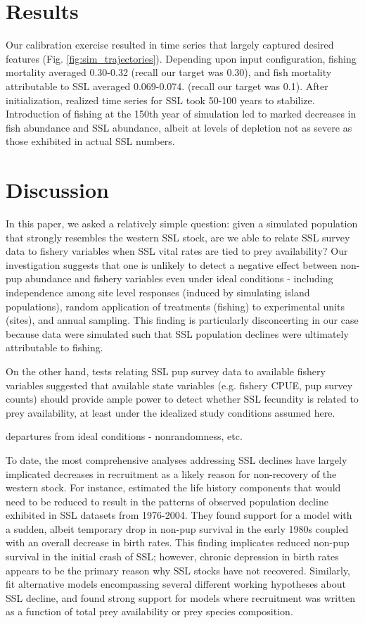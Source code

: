 \documentclass[nonumbib,leqno]{nrc1}
\begin{document}
\section{Results}

Our calibration exercise resulted in time series that largely captured desired features (Fig. \ref{fig:sim_trajectories}).  Depending upon input configuration, fishing mortality averaged 0.30-0.32 (recall our target was 0.30), and fish mortality attributable to SSL averaged 0.069-0.074.  (recall our target was 0.1).  After initialization, realized time series for SSL took 50-100 years to stabilize.  Introduction of fishing at the 150th year of simulation led to marked decreases in fish abundance and SSL abundance, albeit at levels of depletion not as severe as those exhibited in actual SSL numbers.

\section{Discussion}

In this paper, we asked a relatively simple question: given a simulated population that strongly resembles the western SSL stock, are we able to relate SSL survey data to fishery variables when SSL vital rates are tied to prey availability? Our investigation suggests that one is unlikely to detect a negative effect between non-pup abundance and fishery variables even under ideal conditions - including independence among site level responses (induced by simulating island populations), random application of treatments (fishing) to experimental units (sites), and annual sampling.  This finding is particularly disconcerting in our case because data were simulated such that SSL population declines were ultimately attributable to fishing.

On the other hand, tests relating SSL pup survey data to available fishery variables suggested that available state variables (e.g. fishery CPUE, pup survey counts) should provide ample power to detect whether SSL fecundity is related to prey availability, at least under the idealized study conditions assumed here.


departures from ideal conditions - nonrandomness, etc.

To date, the most comprehensive analyses addressing SSL declines have largely implicated decreases in recruitment as a likely reason for non-recovery of the western stock.  For instance, \citet{HolmesEtAl2007} estimated the life history components that would need to be reduced to result in
the patterns of observed population decline exhibited in SSL datasets from 1976-2004.  They found support for a model with a sudden, albeit temporary drop in non-pup survival in the early 1980s coupled with an overall decrease in birth rates.  This finding implicates reduced non-pup survival in the initial crash of SSL; however, chronic depression in birth rates appears to be the primary reason why SSL stocks have not recovered.  Similarly, \citet{Wolf:2008qf} fit alternative models encompassing several different working hypotheses about SSL decline, and found strong support for models where recruitment was written as a function of total prey availability or prey species composition.
\end{document}
